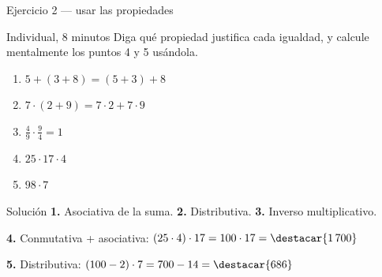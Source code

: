\documentclass[aspectratio=169,10pt]{beamer}
\begin{document}
\begin{frame}{Ejercicio 2 — usar las propiedades}
  \scriptsize
  \begin{alertblock}{Individual, 8 minutos}
    \tiny
    Diga qué propiedad justifica cada igualdad, y calcule mentalmente los
    puntos 4 y 5 usándola.
    \begin{enumerate}\setlength{\itemsep}{-0.02cm}
      \item $5 + (3+8) = (5+3) + 8$
      \item $7\cdot(2+9) = 7\cdot 2 + 7\cdot 9$
      \item $\tfrac{4}{9}\cdot\tfrac{9}{4} = 1$
      \item $25\cdot 17 \cdot 4$
      \item $98 \cdot 7$
    \end{enumerate}
  \end{alertblock}

  \vspace{0.06cm}
  \begin{block}{Solución}
    \tiny
    \textbf{1.} Asociativa de la suma. \quad
    \textbf{2.} Distributiva. \quad
    \textbf{3.} Inverso multiplicativo.

    \vspace{0.08cm}
    \textbf{4.} Conmutativa + asociativa: $(25\cdot 4)\cdot 17
    = 100\cdot 17 = \destacar{1\,700}$

    \vspace{0.08cm}
    \textbf{5.} Distributiva: $(100-2)\cdot 7 = 700 - 14
    = \destacar{686}$
  \end{block}
\end{frame}
\end{document}
